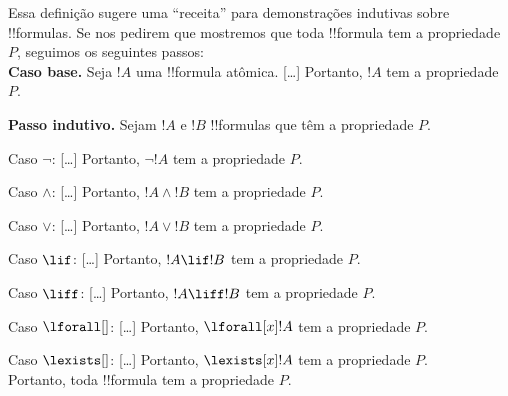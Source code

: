 \documentclass[../../include/open-logic-section]{subfiles}
\begin{document}
\begin{explain}
Essa definição sugere uma ``receita'' para demonstrações indutivas sobre
!!{formula}s. Se nos pedirem que mostremos que toda !!{formula} tem a
propriedade $P$, seguimos os seguintes passos:\\

\textbf{Caso base.} Seja $!A$ uma !!{formula} atômica. [\ldots]
Portanto, $!A$ tem a propriedade $P$.

\textbf{Passo indutivo.} Sejam $!A$ e $!B$ !!{formula}s que têm a
propriedade $P$.

Caso $\lnot$: [\ldots] Portanto, $\lnot !A$ tem a propriedade $P$.

Caso $\land$: [\ldots] Portanto, $!A \land !B$ tem a propriedade $P$.

Caso $\lor$: [\ldots] Portanto, $!A \lor !B$ tem a propriedade $P$.

Caso $\lif$: [\ldots] Portanto, $!A \lif !B$ tem a propriedade $P$.

Caso $\liff$: [\ldots] Portanto, $!A \liff !B$ tem a propriedade $P$.

Caso $\lforall[]$: [\ldots] Portanto, $\lforall[x] !A$ tem a propriedade $P$.

Caso $\lexists[]$: [\ldots] Portanto, $\lexists[x] !A$ tem a propriedade $P$. \\

Portanto, toda !!{formula} tem a propriedade $P$.
\end{explain}
\end{document}
